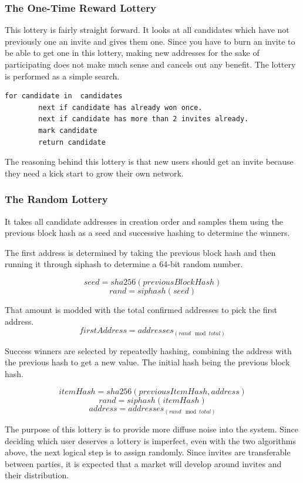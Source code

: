 \documentclass{article}
\begin{document}
\subsubsection{The One-Time Reward Lottery}

This lottery is fairly straight forward.  It looks at all candidates which have not
previously one an invite and gives them one.  Since you have to burn an invite to 
be able to get one in this lottery, making new addresses for the sake of participating
does not make much sense and cancels out any benefit.  The lottery is performed as a 
simple search.

\lstset{language=C}
\begin{lstlisting}[caption=One-Time Reward Algorithm]
    for candidate in  candidates
        next if candidate has already won once.
        next if candidate has more than 2 invites already.
        mark candidate
        return candidate
\end{lstlisting}

The reasoning behind this lottery is that new users should get an invite because
they need a kick start to grow their own network.

\subsubsection{The Random Lottery}
It takes all candidate addresses in creation
order and samples them using the previous block hash as a seed and successive
hashing to determine the winners.

The first address is determined by taking the previous block hash and then running
it through siphash \cite{siphash} to determine a 64-bit random number.

    $$seed = sha256(previousBlockHash)$$
    $$rand = siphash(seed)$$

That amount is modded with the total confirmed addresses to pick the first address.
    $$firstAddress = addresses_{(rand \mod total)}$$

Success winners are selected by repeatedly hashing, combining the address with the
previous hash to get a new value.  The initial hash being the previous block hash.

    $$itemHash = sha256(previousItemHash, address)$$
    $$rand = siphash(itemHash)$$
    $$address = addresses_{(rand \mod total)}$$

The purpose of this lottery is to provide more diffuse noise into the system.  
Since deciding which user deserves a lottery is imperfect, even with the two
algorithms above, the next logical step is to assign randomly.  Since invites
are transferable between parties, it is expected that a market will develop 
around invites and their distribution.
\end{document}
